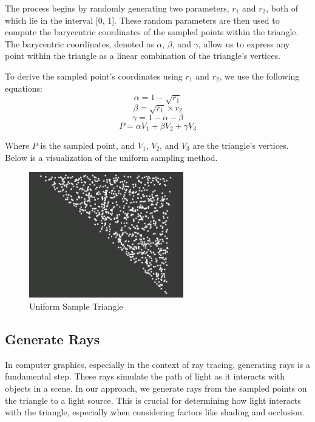 \documentclass[11pt, a4paper,oneside,chapterprefix=false]{scrbook}
\begin{document}
The process begins by randomly generating two parameters, \( r_1 \) and \( r_2 \), both of which lie in the interval [0, 1]. These random parameters are then used to compute the barycentric coordinates of the sampled points within the triangle. The barycentric coordinates, denoted as \( \alpha \), \( \beta \), and \( \gamma \), allow us to express any point within the triangle as a linear combination of the triangle's vertices.

To derive the sampled point's coordinates using \( r_1 \) and \( r_2 \), we use the following equations:
\[ \alpha = 1 - \sqrt{r_1} \]
\[ \beta = \sqrt{r_1} \times r_2 \]
\[ \gamma = 1 - \alpha - \beta \]
\[ P = \alpha V_1 + \beta V_2 + \gamma V_3 \]

Where \( P \) is the sampled point, and \( V_1 \), \( V_2 \), and \( V_3 \) are the triangle's vertices. Below is a visualization of the uniform sampling method.

\begin{minipage}{\textwidth}
	\begin{figure}[H]
		\centering
		\includegraphics*[width=0.6\textwidth]{figures/uniform sample triangle.png}
		\caption{Uniform Sample Triangle}
		\label{fig:uniform sample triangle}
	\end{figure}
\end{minipage}

\subsection{Generate Rays}

In computer graphics, especially in the context of ray tracing, generating rays is a fundamental step. These rays simulate the path of light as it interacts with objects in a scene. In our approach, we generate rays from the sampled points on the triangle to a light source. This is crucial for determining how light interacts with the triangle, especially when considering factors like shading and occlusion.
\end{document}
